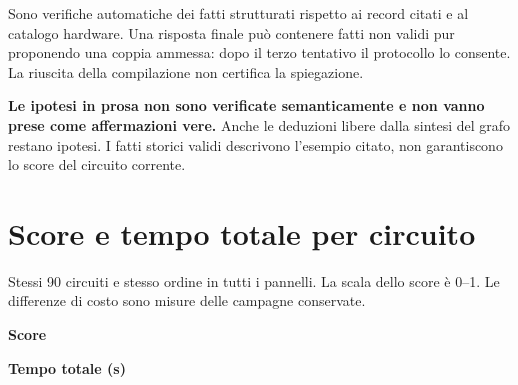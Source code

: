 \documentclass[a4paper,10pt]{article}
\begin{document}
Sono verifiche automatiche dei fatti strutturati rispetto ai record citati
e al catalogo hardware. Una risposta finale può contenere fatti non validi
pur proponendo una coppia ammessa: dopo il terzo tentativo il protocollo lo consente.
La riuscita della compilazione non certifica la spiegazione.

\textbf{Le ipotesi in prosa non sono verificate semanticamente e non vanno
prese come affermazioni vere.} Anche le deduzioni libere dalla sintesi del
grafo restano ipotesi. I fatti storici validi descrivono l'esempio citato,
non garantiscono lo score del circuito corrente.
\clearpage\section{Score e tempo totale per circuito}
Stessi 90 circuiti e stesso ordine in tutti i pannelli. La scala dello score è 0--1. Le differenze di costo sono misure delle campagne conservate.\par\medskip
\noindent\begin{minipage}{.49\linewidth}\centering\textbf{Score}\end{minipage}\hfill\begin{minipage}{.49\linewidth}\centering\textbf{Tempo totale (s)}\end{minipage}\par
\end{document}
